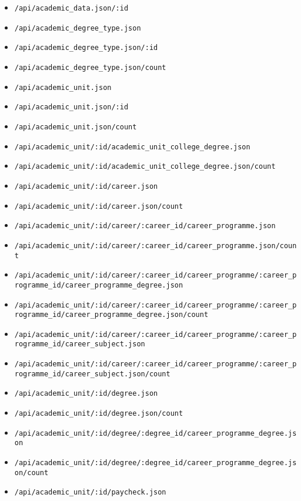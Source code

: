\begingroup
  \begin{itemize}
    \item \lstinline$/api/academic_data.json/:id$
    \item \lstinline$/api/academic_degree_type.json$
    \item \lstinline$/api/academic_degree_type.json/:id$
    \item \lstinline$/api/academic_degree_type.json/count$
    \item \lstinline$/api/academic_unit.json$
    \item \lstinline$/api/academic_unit.json/:id$
    \item \lstinline$/api/academic_unit.json/count$
    \item \lstinline$/api/academic_unit/:id/academic_unit_college_degree.json$
    \item \lstinline$/api/academic_unit/:id/academic_unit_college_degree.json/count$
    \item \lstinline$/api/academic_unit/:id/career.json$
    \item \lstinline$/api/academic_unit/:id/career.json/count$
    \item \lstinline$/api/academic_unit/:id/career/:career_id/career_programme.json$
    \item \lstinline$/api/academic_unit/:id/career/:career_id/career_programme.json/count$
    \item \lstinline$/api/academic_unit/:id/career/:career_id/career_programme/:career_programme_id/career_programme_degree.json$
    \item \lstinline$/api/academic_unit/:id/career/:career_id/career_programme/:career_programme_id/career_programme_degree.json/count$
    \item \lstinline$/api/academic_unit/:id/career/:career_id/career_programme/:career_programme_id/career_subject.json$
    \item \lstinline$/api/academic_unit/:id/career/:career_id/career_programme/:career_programme_id/career_subject.json/count$
    \item \lstinline$/api/academic_unit/:id/degree.json$
    \item \lstinline$/api/academic_unit/:id/degree.json/count$
    \item \lstinline$/api/academic_unit/:id/degree/:degree_id/career_programme_degree.json$
    \item \lstinline$/api/academic_unit/:id/degree/:degree_id/career_programme_degree.json/count$
    \item \lstinline$/api/academic_unit/:id/paycheck.json$

\end{itemize}
